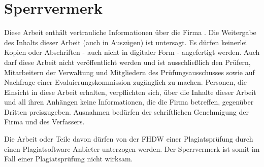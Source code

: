 \section*{Sperrvermerk}

Diese Arbeit enthält vertrauliche Informationen über die Firma \koorperationsunternehmen. Die Weitergabe des Inhalts dieser Arbeit (auch in Auszügen) ist untersagt. Es dürfen keinerlei Kopien oder Abschriften - auch nicht in digitaler Form - angefertigt werden. Auch darf diese Arbeit nicht veröffentlicht werden und ist ausschließlich den Prüfern, Mitarbeitern der Verwaltung und Mitgliedern des Prüfungsausschusses sowie auf Nachfrage einer Evaluierungskommission zugänglich zu machen. Personen, die Einsicht in diese Arbeit erhalten, verpflichten sich, über die Inhalte dieser Arbeit und all ihren Anhängen keine Informationen, die die Firma \koorperationsunternehmen{} betreffen, gegenüber Dritten preiszugeben. Ausnahmen bedürfen der schriftlichen Genehmigung der Firma \koorperationsunternehmen{} und des Verfassers.


Die Arbeit oder Teile davon dürfen von der FHDW einer Plagiatsprüfung durch einen Plagiatsoftware-Anbieter unterzogen werden. Der Sperrvermerk ist somit im Fall einer Plagiatsprüfung nicht wirksam.
\newpage
\fancyhead[R]{\leftmark}